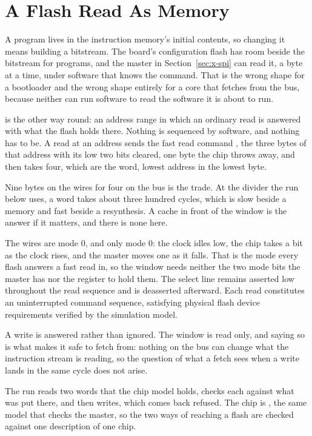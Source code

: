 \section{A Flash Read As Memory}
\label{sec:x-flashwin}

A program lives in the instruction memory's initial contents, so
changing it means building a bitstream. The board's configuration
flash has room beside the bitstream for programs, and the master in
Section~\ref{sec:x-spi} can read it, a byte at a time, under software
that knows the command. That is the wrong shape for a bootloader and
the wrong shape entirely for a core that fetches from the bus, because
neither can run software to read the software it is about to run.

 is the other way round: an address range in which an
ordinary read is answered with what the flash holds there. Nothing is
sequenced by software, and nothing has to be. A read at an address
sends the fast read command , the three bytes of that
address with its low two bits cleared, one byte the chip throws away,
and then takes four, which are the word, lowest address in the lowest
byte.

Nine bytes on the wires for four on the bus is the trade. At the
divider the run below uses, a word takes about three hundred cycles,
which is slow beside a memory and fast beside a resynthesis. A cache
in front of the window is the answer if it matters, and there is none
here.

The wires are mode 0, and only mode 0: the clock idles low, the chip
takes a bit as the clock rises, and the master moves one as it falls.
That is the mode every flash answers a fast read in, so the window
needs neither the two mode bits the master has nor the register to
hold them. The select line remains asserted low throughout the read
sequence and is deasserted afterward. Each read constitutes an
uninterrupted command sequence, satisfying physical flash device
requirements verified by the simulation model.

A write is answered  rather than ignored. The window is
read only, and saying so is what makes it safe to fetch from: nothing
on the bus can change what the instruction stream is reading, so the
question of what a fetch sees when a write lands in the same cycle
does not arise.

The run reads two words that the chip model holds, checks each against
what was put there, and then writes, which comes back refused. The
chip is , the same model that checks the master, so
the two ways of reaching a flash are checked against one description
of one chip.

